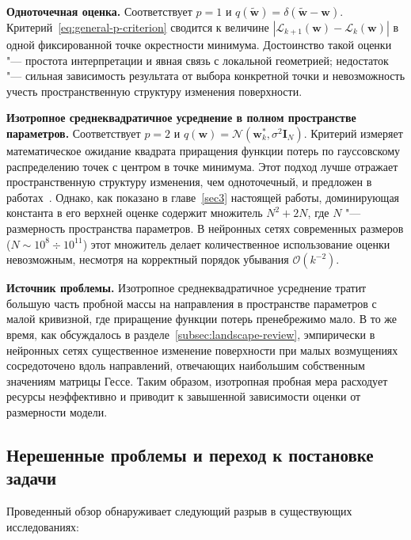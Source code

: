 \textbf{Одноточечная оценка.} Соответствует $p=1$ и $q(\tilde{\mathbf w}) = \delta(\tilde{\mathbf w} - \mathbf w)$. Критерий~\eqref{eq:general-p-criterion} сводится к величине $|\mathcal L_{k+1}(\mathbf w) - \mathcal L_k(\mathbf w)|$ в одной фиксированной точке окрестности минимума. Достоинство такой оценки "--- простота интерпретации и явная связь с локальной геометрией; недостаток "--- сильная зависимость результата от выбора конкретной точки и невозможность учесть пространственную структуру изменения поверхности.

\textbf{Изотропное среднеквадратичное усреднение в полном пространстве параметров.} Соответствует $p=2$ и $q(\mathbf w) = \mathcal N(\mathbf w_k^*, \sigma^2 \mathbf I_N)$. Критерий измеряет математическое ожидание квадрата приращения функции потерь по гауссовскому распределению точек с центром в точке минимума. Этот подход лучше отражает пространственную структуру изменения, чем одноточечный, и предложен в работах~\cite{kiselev2024unraveling}. Однако, как показано в главе~\ref{sec3} настоящей работы, доминирующая константа в его верхней оценке содержит множитель $N^2+2N$, где $N$ "--- размерность пространства параметров. В нейронных сетях современных размеров ($N \sim 10^{8} \div 10^{11}$) этот множитель делает количественное использование оценки невозможным, несмотря на корректный порядок убывания $\mathcal O(k^{-2})$.

\textbf{Источник проблемы.} Изотропное среднеквадратичное усреднение тратит большую часть пробной массы на направления в пространстве параметров с малой кривизной, где приращение функции потерь пренебрежимо мало. В то же время, как обсуждалось в разделе~\ref{subsec:landscape-review}, эмпирически в нейронных сетях существенное изменение поверхности при малых возмущениях сосредоточено вдоль направлений, отвечающих наибольшим собственным значениям матрицы Гессе. Таким образом, изотропная пробная мера расходует ресурсы неэффективно и приводит к завышенной зависимости оценки от размерности модели.

\subsection{Нерешенные проблемы и переход к постановке задачи}\label{subsec:research-gap}

Проведенный обзор обнаруживает следующий разрыв в существующих исследованиях:

